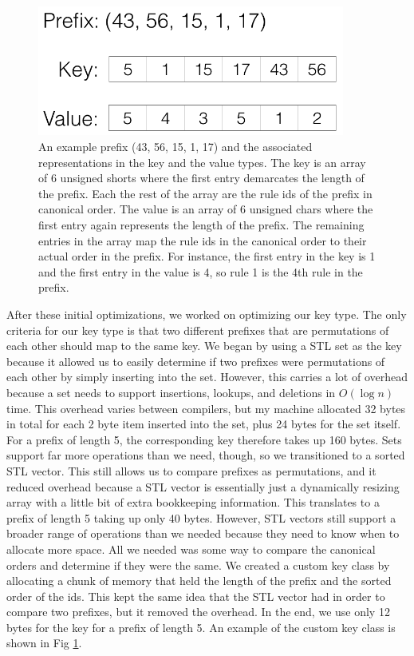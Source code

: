 \begin{figure}[t!]
\begin{center}
\includegraphics[width=0.9\textwidth]{figs/pmap_types.png}
\end{center}
\caption{An example prefix (43, 56, 15, 1, 17) and the associated representations in the key and the value types.
The key is an array of 6 unsigned shorts where the first entry demarcates the length of the prefix.
Each the rest of the array are the rule ids of the prefix in canonical order.
The value is an array of 6 unsigned chars where the first entry again represents the length of the prefix.
The remaining entries in the array map the rule ids in the canonical order to their actual order in the prefix.
For instance, the first entry in the key is 1 and the first entry in the value is 4, so rule 1 is the 4th rule in the prefix.}
\label{fig:pmap-types}
\end{figure}

After these initial optimizations, we worked on optimizing our key type.
The only criteria for our key type is that two different prefixes that are permutations of each other should map to the same key.
We began by using a STL set as the key because it allowed us to easily determine if two prefixes were permutations of each other by simply inserting into the set.
However, this carries a lot of overhead because a set needs to support insertions, lookups, and deletions in $O(\log n)$ time.
This overhead varies between compilers, but my machine allocated 32 bytes in total for each 2 byte item inserted into the set, plus 24 bytes for the set itself.
For a prefix of length 5, the corresponding key therefore takes up 160 bytes.
Sets support far more operations than we need, though, so we transitioned to a sorted STL vector.
This still allows us to compare prefixes as permutations, and it reduced overhead because a STL vector is essentially just a dynamically resizing array with a little bit of extra bookkeeping information.
This translates to a prefix of length 5 taking up only 40 bytes.
However, STL vectors still support a broader range of operations than we needed because they need to know when to allocate more space.
All we needed was some way to compare the canonical orders and determine if they were the same.
We created a custom key class by allocating a chunk of memory that held the length of the prefix and the sorted order of the ids.
This kept the same idea that the STL vector had in order to compare two prefixes, but it removed the overhead.
In the end, we use only 12 bytes for the key for a prefix of length 5.
An example of the custom key class is shown in Fig \ref{fig:pmap-types}.

